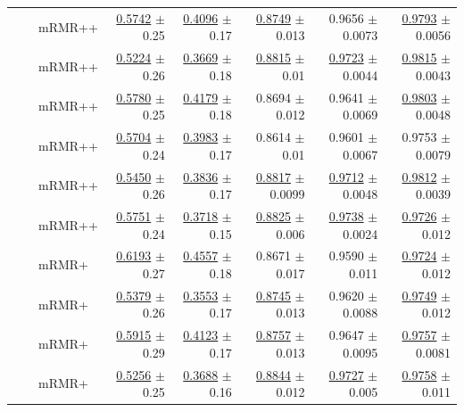 \begin{longtable}{llp{}rrrrr}
 &  & mRMR++ & \underline{0.5742} {\scriptsize $\pm$ 0.25} & \underline{0.4096} {\scriptsize $\pm$ 0.17} & \underline{0.8749} {\scriptsize $\pm$ 0.013} & 0.9656 {\scriptsize $\pm$ 0.0073} & \underline{0.9793} {\scriptsize $\pm$ 0.0056} \\
 &  & mRMR++ & \underline{0.5224} {\scriptsize $\pm$ 0.26} & \underline{0.3669} {\scriptsize $\pm$ 0.18} & \underline{0.8815} {\scriptsize $\pm$ 0.01} & \underline{0.9723} {\scriptsize $\pm$ 0.0044} & \underline{0.9815} {\scriptsize $\pm$ 0.0043} \\
 &  & mRMR++ & \underline{0.5780} {\scriptsize $\pm$ 0.25} & \underline{0.4179} {\scriptsize $\pm$ 0.18} & 0.8694 {\scriptsize $\pm$ 0.012} & 0.9641 {\scriptsize $\pm$ 0.0069} & \underline{0.9803} {\scriptsize $\pm$ 0.0048} \\
 &  & mRMR++ & \underline{0.5704} {\scriptsize $\pm$ 0.24} & \underline{0.3983} {\scriptsize $\pm$ 0.17} & 0.8614 {\scriptsize $\pm$ 0.01} & 0.9601 {\scriptsize $\pm$ 0.0067} & 0.9753 {\scriptsize $\pm$ 0.0079} \\
 &  & mRMR++ & \underline{0.5450} {\scriptsize $\pm$ 0.26} & \underline{0.3836} {\scriptsize $\pm$ 0.17} & \underline{0.8817} {\scriptsize $\pm$ 0.0099} & \underline{0.9712} {\scriptsize $\pm$ 0.0048} & \underline{0.9812} {\scriptsize $\pm$ 0.0039} \\
 &  & mRMR++ & \underline{0.5751} {\scriptsize $\pm$ 0.24} & \underline{0.3718} {\scriptsize $\pm$ 0.15} & \underline{0.8825} {\scriptsize $\pm$ 0.006} & \underline{0.9738} {\scriptsize $\pm$ 0.0024} & \underline{0.9726} {\scriptsize $\pm$ 0.012} \\
 &  & mRMR+ & \underline{0.6193} {\scriptsize $\pm$ 0.27} & \underline{0.4557} {\scriptsize $\pm$ 0.18} & 0.8671 {\scriptsize $\pm$ 0.017} & 0.9590 {\scriptsize $\pm$ 0.011} & \underline{0.9724} {\scriptsize $\pm$ 0.012} \\
 &  & mRMR+ & \underline{0.5379} {\scriptsize $\pm$ 0.26} & \underline{0.3553} {\scriptsize $\pm$ 0.17} & \underline{0.8745} {\scriptsize $\pm$ 0.013} & 0.9620 {\scriptsize $\pm$ 0.0088} & \underline{0.9749} {\scriptsize $\pm$ 0.012} \\
 &  & mRMR+ & \underline{0.5915} {\scriptsize $\pm$ 0.29} & \underline{0.4123} {\scriptsize $\pm$ 0.17} & \underline{0.8757} {\scriptsize $\pm$ 0.013} & 0.9647 {\scriptsize $\pm$ 0.0095} & \underline{0.9757} {\scriptsize $\pm$ 0.0081} \\
 &  & mRMR+ & \underline{0.5256} {\scriptsize $\pm$ 0.25} & \underline{0.3688} {\scriptsize $\pm$ 0.16} & \underline{0.8844} {\scriptsize $\pm$ 0.012} & \underline{0.9727} {\scriptsize $\pm$ 0.005} & \underline{0.9758} {\scriptsize $\pm$ 0.011} \\

\end{longtable}
